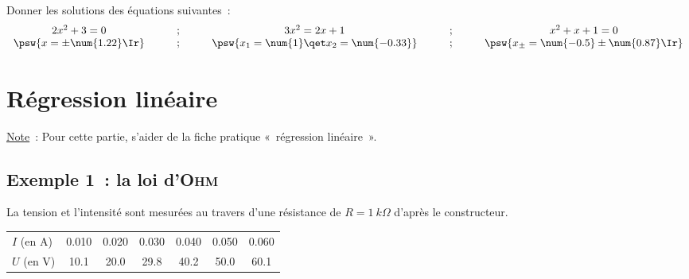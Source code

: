 \documentclass[a4paper, 12pt, garamond]{book}
\begin{document}
Donner les solutions des équations suivantes~:
\begin{gather*}
	\begin{array}{ccccc}
		2x^2+3 = 0
		\qquad & ; & \qquad
		3x^2 = 2x+1
		\qquad & ; & \qquad
		x^2+x+1 = 0
		\\
		\psw{
			x = \pm \num{1.22}\Ir
		}
		\qquad & ; & \qquad
		\psw{
			x_1 = \num{1} \qet x_2 = \num{-0.33}
		}
		\qquad & ; & \qquad
		\psw{
			x_\pm = \num{-0.5} \pm \num{0.87}\Ir
		}
	\end{array}
\end{gather*}

\section{Régression linéaire}

\underline{Note}~: Pour cette partie, s'aider de la fiche pratique «~régression
linéaire~».

\subsection{Exemple 1~: la loi d'\textsc{Ohm}}

La tension et l'intensité sont mesurées au travers d'une résistance de $R=
	\SI{1}{k\Omega}$ d'après le constructeur.

\begin{center}
	\begin{tabular}{ l  c  c  c  c  c  c }
		\toprule
		$I$ (en A)  & \num{0,010} & \num{0,020} & \num{0,030} & \num{0,040} &
		\num{0,050} & \num{0,060}                                             \\

		$U$ (en V)  & \num{10,1}  & \num{20,0}  & \num{29,8}  & \num{40,2}  &
		\num{50,0}  & \num{60,1}                                              \\

		\bottomrule
	\end{tabular}
\end{center}
\end{document}

